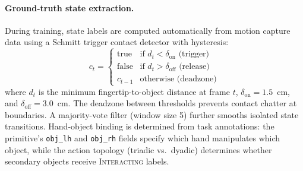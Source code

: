 \documentclass[sigconf, screen, review, anonymous]{acmart}
\begin{document}
\paragraph{Ground-truth state extraction.}
During training, state labels are computed automatically from motion capture data using a Schmitt trigger contact detector with hysteresis:
\begin{equation}
    c_t = \begin{cases}
        \text{true} & \text{if } d_t < \delta_{\text{on}} \text{ (trigger)} \\
        \text{false} & \text{if } d_t > \delta_{\text{off}} \text{ (release)} \\
        c_{t-1} & \text{otherwise (deadzone)}
    \end{cases}
    \label{eq:schmitt}
\end{equation}
where $d_t$ is the minimum fingertip-to-object distance at frame $t$, $\delta_{\text{on}} = 1.5$~cm, and $\delta_{\text{off}} = 3.0$~cm. The deadzone between thresholds prevents contact chatter at boundaries. A majority-vote filter (window size 5) further smooths isolated state transitions.
Hand-object binding is determined from task annotations: the primitive's \texttt{obj\_lh} and \texttt{obj\_rh} fields specify which hand manipulates which object, while the action topology (triadic vs.\ dyadic) determines whether secondary objects receive \textsc{Interacting} labels.
\end{document}
